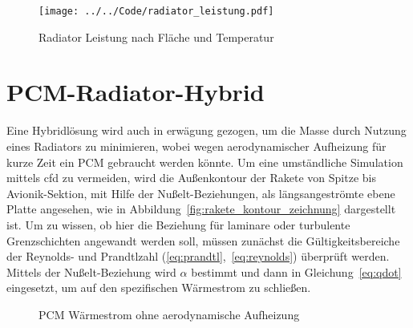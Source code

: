 \begin{figure}[H]
  \centering
  \texttt{[image: ../../Code/radiator\_leistung.pdf]}
  \caption{Radiator Leistung nach Fläche und Temperatur}\label{fig:radiator_flaeche_leistung}
\end{figure}

\newpage

\section{PCM-Radiator-Hybrid}\label{sec:pcm_radiator_hybrid}

Eine Hybridlösung wird auch in erwägung gezogen, um die Masse durch Nutzung eines Radiators zu minimieren, wobei wegen aerodynamischer Aufheizung für kurze Zeit ein PCM gebraucht werden könnte.
Um eine umständliche Simulation mittels \ac{cfd} zu vermeiden, wird die Außenkontour der Rakete von Spitze bis Avionik-Sektion, mit Hilfe der Nußelt-Beziehungen, als längsangeströmte ebene Platte angesehen,
wie in Abbildung~\ref{fig:rakete_kontour_zeichnung} dargestellt ist.
Um zu wissen, ob hier die Beziehung für laminare oder turbulente Grenzschichten angewandt werden soll, müssen zunächst die Gültigkeitsbereiche der Reynolds- und Prandtlzahl (\ref{eq:prandtl},~\ref{eq:reynolds}) überprüft werden.
Mittels der Nußelt-Beziehung wird $\alpha$ bestimmt und dann in Gleichung~\ref{eq:qdot} eingesetzt, um auf den spezifischen Wärmestrom zu schließen.

\newpage

\begin{figure}
  \centering
  \caption{PCM Wärmestrom ohne aerodynamische Aufheizung}\label{fig:pcm_waermestrom_diagramm}
\end{figure}

